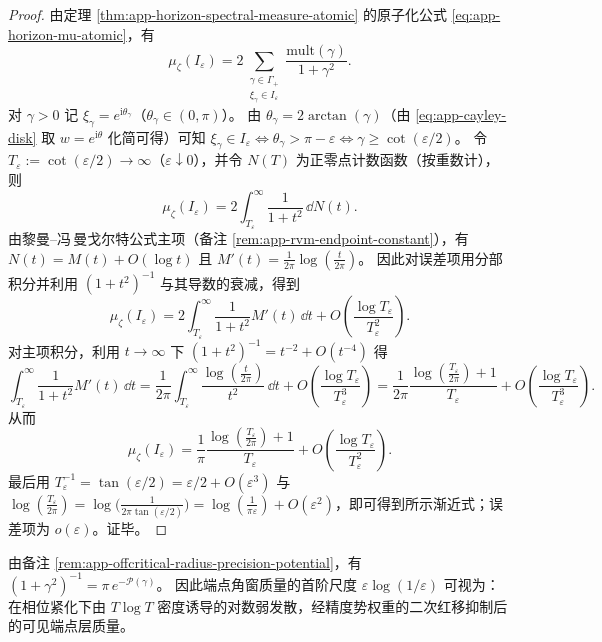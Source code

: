 \begin{proof}
由定理 \ref{thm:app-horizon-spectral-measure-atomic} 的原子化公式 \eqref{eq:app-horizon-mu-atomic}，有
\[
\mu_{\zeta}(I_{\varepsilon})
=
2\sum_{\substack{\gamma\in\Gamma_+\\ \xi_{\gamma}\in I_{\varepsilon}}}
\frac{\mathrm{mult}(\gamma)}{1+\gamma^2}.
\]
对 \(\gamma>0\) 记 \(\xi_{\gamma}=e^{\mathrm{i}\theta_{\gamma}}\)（\(\theta_{\gamma}\in(0,\pi)\)）。
由 \(\theta_{\gamma}=2\arctan(\gamma)\)（由 \eqref{eq:app-cayley-disk} 取 \(w=e^{\mathrm{i}\theta}\) 化简可得）可知
\(\xi_{\gamma}\in I_{\varepsilon}\iff \theta_{\gamma}>\pi-\varepsilon\iff \gamma\ge \cot(\varepsilon/2)\)。
令 \(T_{\varepsilon}:=\cot(\varepsilon/2)\to\infty\)（\(\varepsilon\downarrow 0\)），并令 \(N(T)\) 为正零点计数函数（按重数计），则
\[
\mu_{\zeta}(I_{\varepsilon})
=2\int_{T_{\varepsilon}}^{\infty}\frac{1}{1+t^2}\,\dd N(t).
\]
由黎曼--冯\,曼戈尔特公式主项（备注 \ref{rem:app-rvm-endpoint-constant}），有
\(
N(t)=M(t)+O(\log t)
\)
且 \(M'(t)=\frac{1}{2\pi}\log(\frac{t}{2\pi})\)。
因此对误差项用分部积分并利用 \((1+t^2)^{-1}\) 与其导数的衰减，得到
\[
\mu_{\zeta}(I_{\varepsilon})
=2\int_{T_{\varepsilon}}^{\infty}\frac{1}{1+t^2}M'(t)\,\dd t
+O\!\left(\frac{\log T_{\varepsilon}}{T_{\varepsilon}^2}\right).
\]
对主项积分，利用 \(t\to\infty\) 下 \( (1+t^2)^{-1}=t^{-2}+O(t^{-4}) \) 得
\[
\int_{T_{\varepsilon}}^{\infty}\frac{1}{1+t^2}M'(t)\,\dd t
=\frac{1}{2\pi}\int_{T_{\varepsilon}}^{\infty}\frac{\log(\frac{t}{2\pi})}{t^2}\,\dd t
+O\!\left(\frac{\log T_{\varepsilon}}{T_{\varepsilon}^3}\right)
=\frac{1}{2\pi}\frac{\log(\frac{T_{\varepsilon}}{2\pi})+1}{T_{\varepsilon}}
+O\!\left(\frac{\log T_{\varepsilon}}{T_{\varepsilon}^3}\right).
\]
从而
\[
\mu_{\zeta}(I_{\varepsilon})
=\frac{1}{\pi}\frac{\log(\frac{T_{\varepsilon}}{2\pi})+1}{T_{\varepsilon}}
+O\!\left(\frac{\log T_{\varepsilon}}{T_{\varepsilon}^2}\right).
\]
最后用 \(T_{\varepsilon}^{-1}=\tan(\varepsilon/2)=\varepsilon/2+O(\varepsilon^{3})\) 与
\(\log(\tfrac{T_{\varepsilon}}{2\pi})=\log\!\bigl(\tfrac{1}{2\pi\tan(\varepsilon/2)}\bigr)=\log(\tfrac{1}{\pi\varepsilon})+O(\varepsilon^{2})\)，即可得到所示渐近式；误差项为 \(o(\varepsilon)\)。证毕。
\end{proof}

\begin{remark}[与精度势权重的对齐]\label{rem:app-horizon-endpoint-window-mass-precision-potential}
由备注 \ref{rem:app-offcritical-radius-precision-potential}，有
\(
(1+\gamma^2)^{-1}=\pi\,e^{-\mathcal{P}(\gamma)}
\)。
因此端点角窗质量的首阶尺度 \(\varepsilon\log(1/\varepsilon)\) 可视为：在相位紧化下由 \(T\log T\) 密度诱导的对数弱发散，经精度势权重的二次红移抑制后的可见端点层质量。
\end{remark}

